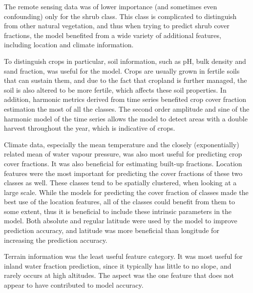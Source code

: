 \documentclass[review,authoryear,3p]{elsarticle}
\begin{document}
The remote sensing data was of lower importance (and sometimes even confounding) only for the shrub class.
This class is complicated to distinguish from other natural vegetation, and thus when trying to predict shrub cover fractions, the model benefited from a wide variety of additional features, including location and climate information.

To distinguish crops in particular, soil information, such as pH, bulk density and sand fraction, was useful for the model.
Crops are usually grown in fertile soils that can sustain them, and due to the fact that cropland is further managed, the soil is also altered to be more fertile, which affects these soil properties.
In addition, harmonic metrics derived from time series benefited crop cover fraction estimation the most of all the classes.
The second order amplitude and sine of the harmonic model of the time series allows the model to detect areas with a double harvest throughout the year, which is indicative of crops.

Climate data, especially the mean temperature and the closely (exponentially) related mean of water vapour pressure, was also most useful for predicting crop cover fractions.
It was also beneficial for estimating built-up fractions.
Location features were the most important for predicting the cover fractions of these two classes as well.
These classes tend to be spatially clustered, when looking at a large scale.
While the models for predicting the cover fraction of classes made the best use of the location features, all of the classes could benefit from them to some extent, thus it is beneficial to include these intrinsic parameters in the model.
Both absolute and regular latitude were used by the model to improve prediction accuracy, and latitude was more beneficial than longitude for increasing the prediction accuracy.

Terrain information was the least useful feature category.
It was most useful for inland water fraction prediction, since it typically has little to no slope, and rarely occurs at high altitudes.
The aspect was the one feature that does not appear to have contributed to model accuracy.
\end{document}

